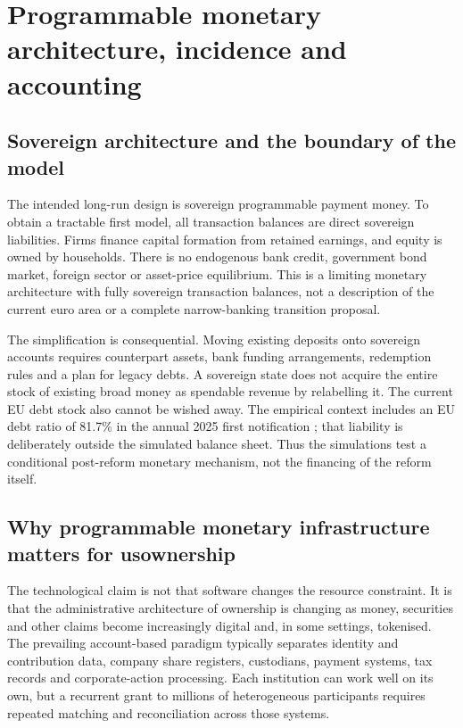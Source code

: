 \section{Programmable monetary architecture, incidence and accounting}
\subsection{Sovereign architecture and the boundary of the model}
The intended long-run design is sovereign programmable payment money. To obtain a tractable first model, all transaction balances are direct sovereign liabilities. Firms finance capital formation from retained earnings, and equity is owned by households. There is no endogenous bank credit, government bond market, foreign sector or asset-price equilibrium. This is a limiting monetary architecture with fully sovereign transaction balances, not a description of the current euro area or a complete narrow-banking transition proposal.

The simplification is consequential. Moving existing deposits onto sovereign accounts requires counterpart assets, bank funding arrangements, redemption rules and a plan for legacy debts. A sovereign state does not acquire the entire stock of existing broad money as spendable revenue by relabelling it. The current EU debt stock also cannot be wished away. The empirical context includes an EU debt ratio of 81.7\% in the annual 2025 first notification \citep{eurostat2026}; that liability is deliberately outside the simulated balance sheet. Thus the simulations test a conditional post-reform monetary mechanism, not the financing of the reform itself.

\subsection{Why programmable monetary infrastructure matters for usownership}
The technological claim is not that software changes the resource constraint. It is that the administrative architecture of ownership is changing as money, securities and other claims become increasingly digital and, in some settings, tokenised. The prevailing account-based paradigm typically separates identity and contribution data, company share registers, custodians, payment systems, tax records and corporate-action processing. Each institution can work well on its own, but a recurrent grant to millions of heterogeneous participants requires repeated matching and reconciliation across those systems.

